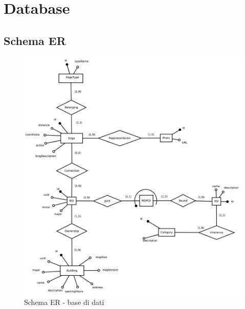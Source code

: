 \documentclass[../ManualeSviluppatore.tex]{subfiles}
\begin{document}
\section{Database}
	\subsection{Schema ER}
		\begin{figure} [h]
				\includegraphics[width=\textwidth]{img/Database}		
				\caption{Schema ER - base di dati}
				\label{Database}
		\end{figure}
\end{document}
